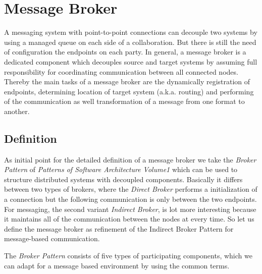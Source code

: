 \section{Message Broker}
\label{intro-messaging-broker}
A messaging system with point-to-point connections can decouple two systems
by using a managed queue on each side of a collaboration. But there is
still the need of configuration the endpoints on each party. In general, a
message broker is a dedicated component which decouples source and
target systems by assuming full responsibility for coordinating communication between
all connected nodes. Thereby the main tasks of a message broker are the
dynamically registration of endpoints, determining location of target system
(a.k.a. routing) and performing of the communication as well transformation of a
message from one format to another.\cite{MSDNIntegration} \\

\subsection{Definition}
As initial point for the detailed definition of a message broker we take the
\textit{Broker Pattern} of  \textit{Patterns of Software Architecture Volume1}
which can be used to structure distributed systems with decoupled components.
Basically it differs between two types of brokers, where the \textit{Direct
Broker} performs a initialization of a connection but the following communication
is only between the two endpoints. For messaging, the second variant
\textit{Indirect Broker}, is lot more interesting because it maintains all of
the communication between the nodes at every time. So let us define the message
broker as refinement of the Indirect Broker Pattern for message-based
communication.\cite{POSA1} 

The \textit{Broker Pattern} consists of five types of participating components,
which we can adapt for a message based environment by using the common terms.

